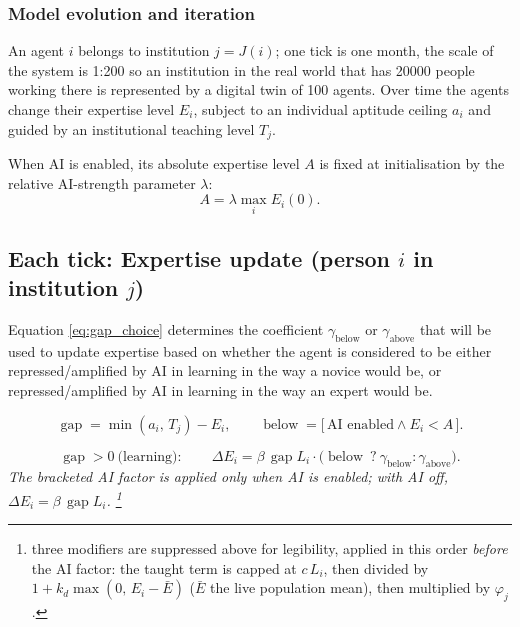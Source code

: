 \documentclass[11pt]{article}
\newcommand{\eqnote}[1]{{\small\itshape #1}\par\addvspace{4pt}}
\begin{document}
\subsubsection{Model evolution and iteration}


\noindent
An agent $i$ belongs to institution $j=J(i)$; one tick is one month, the scale of the system is 1:200 so an institution in the real world that has 20000 people working there is represented by a digital twin of 100 agents. Over time the agents change their expertise level $E_i$, subject to an individual aptitude ceiling $a_i$ and guided by an institutional teaching level $T_j$.

When AI is enabled, its absolute expertise level $A$ is fixed at initialisation by the relative AI-strength parameter $\lambda$:
\begin{equation}\label{eq:ai_level}
  A = \lambda \max_i E_i(0).
\end{equation}

\subsection*{Each tick: Expertise update (person $i$ in institution $j$)}
Equation \ref{eq:gap_choice} determines the coefficient $\gamma_{\mathrm{below}}$ or $\gamma_{\mathrm{above}}$ that will be used to update expertise based on whether the agent is considered to be either repressed/amplified by AI in learning in the way a novice would be, or repressed/amplified by AI in learning in the way an expert would be.  

\begin{equation}\label{eq:gap_choice}
  \operatorname{gap} = \min(a_i,\, T_j) - E_i, \qquad
  \operatorname{below} = \bigl[\, \text{AI enabled} \wedge E_i < A \,\bigr].
\end{equation}

\begin{equation}\label{eq:E10}
  \operatorname{gap} > 0 \ \text{(learning)}: \qquad
  \Delta E_i = \beta \, \operatorname{gap} L_i \cdot
    \bigl( \operatorname{below} \ ? \ \gamma_{\text{below}} : \gamma_{\text{above}} \bigr).
\end{equation}
\eqnote{The bracketed AI factor is applied only when AI is enabled; with AI off,
$\Delta E_i = \beta\,\operatorname{gap} L_i$. \footnote{ three modifiers are suppressed above
for legibility, applied in this order \emph{before} the AI factor: the taught term
is capped at $c\,L_i$, then divided by $1 + k_d \max(0,\, E_i - \bar E)$ ($\bar E$
the live population mean), then multiplied by $\varphi_j$.}}
\end{document}
